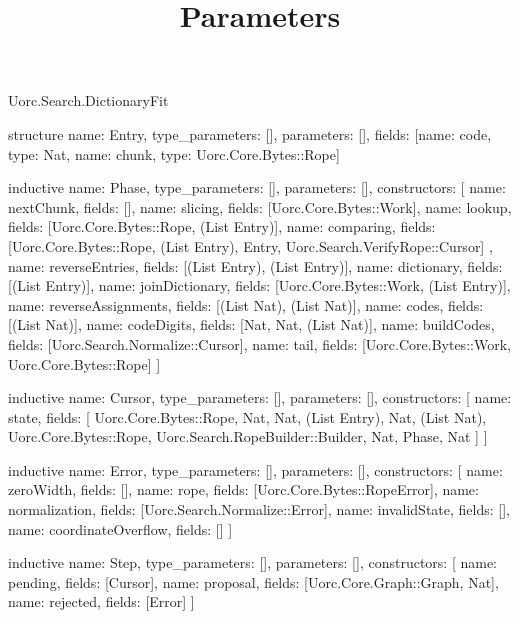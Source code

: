\begin{lexlean}{Uorc.Search.DictionaryFit}
\title{Parameters}
\begin{semanticmodule}
structure{
  name: Entry,
  type_parameters: [],
  parameters: [],
  fields: [{name: code, type: Nat}, {name: chunk, type: Uorc.Core.Bytes::Rope}]
}

inductive{
  name: Phase,
  type_parameters: [],
  parameters: [],
  constructors: [
    {name: nextChunk, fields: []},
    {name: slicing, fields: [Uorc.Core.Bytes::Work]},
    {name: lookup, fields: [Uorc.Core.Bytes::Rope, (List Entry)]},
    {
      name: comparing,
      fields: [Uorc.Core.Bytes::Rope, (List Entry), Entry, Uorc.Search.VerifyRope::Cursor]
    },
    {name: reverseEntries, fields: [(List Entry), (List Entry)]},
    {name: dictionary, fields: [(List Entry)]},
    {name: joinDictionary, fields: [Uorc.Core.Bytes::Work, (List Entry)]},
    {name: reverseAssignments, fields: [(List Nat), (List Nat)]},
    {name: codes, fields: [(List Nat)]},
    {name: codeDigits, fields: [Nat, Nat, (List Nat)]},
    {name: buildCodes, fields: [Uorc.Search.Normalize::Cursor]},
    {name: tail, fields: [Uorc.Core.Bytes::Work, Uorc.Core.Bytes::Rope]}
  ]
}

inductive{
  name: Cursor,
  type_parameters: [],
  parameters: [],
  constructors: [
    {
      name: state,
      fields: [
        Uorc.Core.Bytes::Rope,
        Nat,
        Nat,
        (List Entry),
        Nat,
        (List Nat),
        Uorc.Core.Bytes::Rope,
        Uorc.Search.RopeBuilder::Builder,
        Nat,
        Phase,
        Nat
      ]
    }
  ]
}

inductive{
  name: Error,
  type_parameters: [],
  parameters: [],
  constructors: [
    {name: zeroWidth, fields: []},
    {name: rope, fields: [Uorc.Core.Bytes::RopeError]},
    {name: normalization, fields: [Uorc.Search.Normalize::Error]},
    {name: invalidState, fields: []},
    {name: coordinateOverflow, fields: []}
  ]
}

inductive{
  name: Step,
  type_parameters: [],
  parameters: [],
  constructors: [
    {name: pending, fields: [Cursor]},
    {name: proposal, fields: [Uorc.Core.Graph::Graph, Nat]},
    {name: rejected, fields: [Error]}
  ]
}


\end{semanticmodule}
\end{lexlean}
